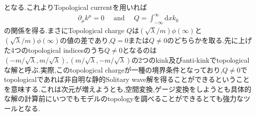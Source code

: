 \documentclass[dvipdfmx,11pt,a4paper,oneside,openany]{jsbook}
\begin{document}
となる.これよりTopological currentを用いれば
\begin{align}
    \partial_{\mu} k^{\mu}=0 \quad \text { and } \quad Q=\int_{-\infty}^{\infty} \mathrm{d} x k_{0}
\end{align}
の関係を得る.まさにTopological charge $Q$は$(\sqrt{\lambda}/m)\phi(\infty)$と$(\sqrt{\lambda}/m)\phi(\infty)$の値の差であり,$Q=0$または$Q\neq 0$のどちらかを取る.先に上げた4つのtopological indicesのうち$Q\neq0$となるのは$(-m/\sqrt{\lambda},m/\sqrt{\lambda}),(m/\sqrt{\lambda},-m/\sqrt{\lambda})$の2つのkink及びanti-kinkでtopologicalな解と呼ぶ.実際,このtopological chargeが一種の境界条件となっており,$Q\neq0$でtopologicalであれば非自明な静的Solitary wave解を得ることができるということを意味する.これは次元が増えようとも,空間変換,ゲージ変換をしようとも具体的な解の計算前にいつでもモデルのtopologyを調べることができるとても強力なツールとなる.
\end{document}
